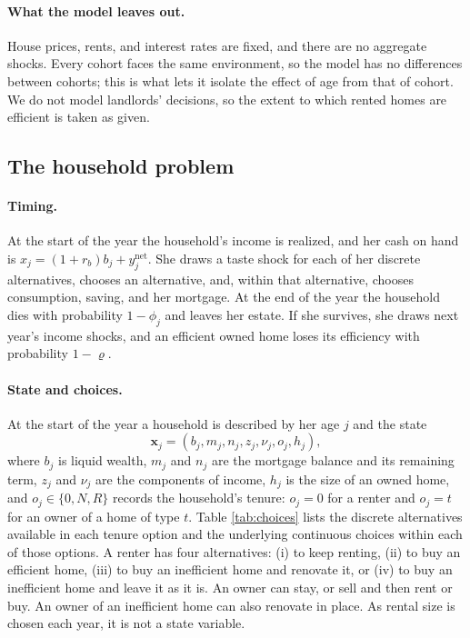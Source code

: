 \paragraph{What the model leaves out.}
House prices, rents, and interest rates are fixed, and there are no
aggregate shocks. Every cohort faces the same environment, so the model has
no differences between cohorts; this is what lets it isolate the effect of
age from that of cohort. We do not model landlords' decisions, so the extent to which rented homes are efficient is taken as given.

\subsection{The household problem}\label{sec:model-problem}

\paragraph{Timing.}
At the start of the year the household's income is realized, and her cash
on hand is $x_j=(1+r_b)b_j+y^{\mathrm{net}}_j$. She draws a taste shock
for each of her discrete alternatives, chooses an alternative, and, within
that alternative,
chooses consumption, saving, and her mortgage. At the end of the year the
household dies with probability $1-\phi_j$ and leaves her estate. If she
survives, she draws next year's income shocks, and an efficient owned home
loses its efficiency with probability $1-\varrho$.

\paragraph{State and choices.}
At the start of the year a household is described by her age $j$ and the
state
\begin{equation}
  \mathbf x_j=(b_j,m_j,n_j,z_j,\nu_j,o_j,h_j),
  \label{eq:state}
\end{equation}
where $b_j$ is liquid wealth, $m_j$ and $n_j$ are the mortgage balance and
its remaining term, $z_j$ and $\nu_j$ are the components of income, $h_j$
is the size of an owned home, and  $o_j\in\{0,N,R\}$ records the
household's tenure: $o_j=0$ for a renter and $o_j=t$ for an owner of a
home of type $t$. Table \ref{tab:choices} lists the discrete alternatives
available in each tenure option and the underlying continuous choices within each of those options. A renter
has four alternatives: (i) to keep renting, (ii) to buy an efficient home, (iii) to
buy an inefficient home and renovate it, or (iv) to buy an inefficient home and
leave it as it is. An owner can stay, or sell and then rent or buy. An owner of an inefficient home can also renovate in place. As rental size is chosen each year, it is not a state variable.

